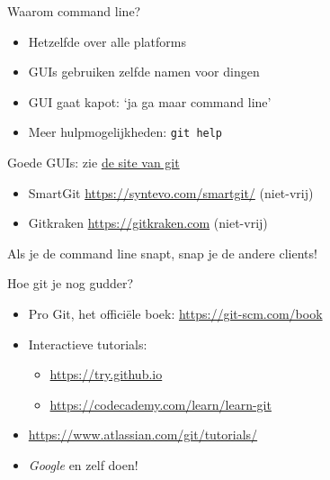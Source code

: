 \begin{frame}{Waarom command line?}
	\begin{itemize}
		\item Hetzelfde over alle platforms
		\item GUIs gebruiken zelfde namen voor dingen
		\item GUI gaat kapot: `ja ga maar command line'
		\item Meer hulpmogelijkheden: \texttt{git help}
	\end{itemize}
	Goede GUIs: zie \href{https://git-scm.com/downloads/guis}{de site van git}
	\begin{itemize}
		\item SmartGit \url{https://syntevo.com/smartgit/} (niet-vrij)
		\item Gitkraken \url{https://gitkraken.com} (niet-vrij)
	\end{itemize}
	Als je de command line snapt, snap je de andere clients!
\end{frame}

\begin{frame}{Hoe git je nog gudder?}
	\begin{itemize}
		\item Pro Git, het offici\"ele boek: \url{https://git-scm.com/book}
		\item Interactieve tutorials:
			\begin{itemize}
				\item \url{https://try.github.io}
				\item \url{https://codecademy.com/learn/learn-git}
			\end{itemize}
		\item \url{https://www.atlassian.com/git/tutorials/}
		\item \emph{Google} en zelf doen!
	\end{itemize}
\end{frame}
